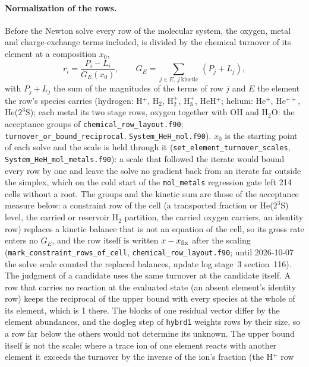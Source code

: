 \paragraph{Normalization of the rows.} Before the Newton solve every row of
the molecular system, the oxygen, metal and charge-exchange terms included,
is divided by the chemical turnover of its element at a composition $x_0$,
\begin{equation}
r_i = \frac{P_i - L_i}{G_E(x_0)},\qquad G_E = \sum_{j\in E,\ j\ \mathrm{kinetic}}\,(P_j + L_j),
\label{eq:ion:element_turnover}
\end{equation}
with $P_j+L_j$ the sum of the magnitudes of the terms of row $j$ and $E$ the
element the row's species carries (hydrogen: H$^+$, H$_2$, H$_2^+$, H$_3^+$,
HeH$^+$; helium: He$^+$, He$^{++}$, He($2^3$S); each metal its two stage
rows, oxygen together with OH and H$_2$O: the acceptance groups of
\texttt{chemical\_row\_layout.f90}; \texttt{turnover\_or\_bound\_reciprocal},
\texttt{System\_HeH\_mol.f90}). $x_0$ is the starting point of each solve and
the scale is held through it (\texttt{set\_element\_turnover\_scales},
\texttt{System\_HeH\_mol\_metals.f90}): a scale that followed the iterate
would bound every row by one and leave the solve no gradient back from an
iterate far outside the simplex, which on the cold start of the
\texttt{mol\_metals} regression gate left 214 cells without a root. The
groups and the kinetic sum are those of the acceptance measure below: a
constraint row of the cell (a transported fraction or He($2^3$S) level, the
carried or reservoir H$_2$ partition, the carried oxygen carriers, an identity
row) replaces a kinetic balance that is not an equation of the cell, so its
gross rate enters no $G_E$, and the row itself is written $x - x_{\rm fix}$
after the scaling (\texttt{mark\_constraint\_rows\_of\_cell},
\texttt{chemical\_row\_layout.f90}; until 2026-10-07 the solve scale counted
the replaced balances, update log stage~3 section~116). The judgment of a
candidate uses the same turnover at the candidate itself. A row that carries no reaction at the
evaluated state (an absent element's identity row) keeps the reciprocal of the
upper bound with every species at the whole of its element, which is 1 there.
The blocks of one residual vector differ by the element abundances, and the
dogleg step of \texttt{hybrd1} weights rows by their size, so a row far below
the others would not determine its unknown. The upper bound itself is not the
scale: where a trace ion of one element reacts with another element it
exceeds the turnover by the inverse of the ion's fraction (the H$^+$ row
